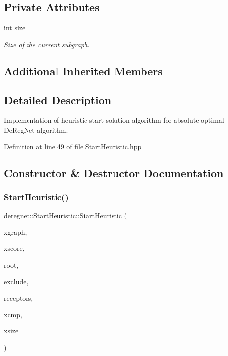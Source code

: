 \subsection*{Private Attributes}
\begin{DoxyCompactItemize}
\item 
int \hyperlink{classderegnet_1_1StartHeuristic_acd3b3c6a5103491c252b774545ad470b}{size}
\begin{DoxyCompactList}\small\item\em Size of the current subgraph. \end{DoxyCompactList}\end{DoxyCompactItemize}
\subsection*{Additional Inherited Members}


\subsection{Detailed Description}
Implementation of heuristic start solution algorithm for absolute optimal De\+Reg\+Net algorithm. 

Definition at line 49 of file Start\+Heuristic.\+hpp.



\subsection{Constructor \& Destructor Documentation}
\mbox{\label{classderegnet_1_1StartHeuristic_aff83b16a2ae0fd4041f19f787a0da23f}} 
\subsubsection{\texorpdfstring{Start\+Heuristic()}{StartHeuristic()}}
{\footnotesize\ttfamily deregnet\+::\+Start\+Heuristic\+::\+Start\+Heuristic (\begin{DoxyParamCaption}\item[{\hyperlink{namespacederegnet_a55b76c55bbabc682cbc61f8b9948799e}{Graph} $\ast$}]{xgraph,  }\item[{\hyperlink{namespacederegnet_ae102b707ae1d6f83c639ece5e0dd5658}{Node\+Map}$<$ double $>$ $\ast$}]{xscore,  }\item[{\hyperlink{namespacederegnet_a744bad34f2de9856d36715a445f027f3}{Node} $\ast$}]{root,  }\item[{std\+::set$<$ \hyperlink{namespacederegnet_a744bad34f2de9856d36715a445f027f3}{Node} $>$ $\ast$}]{exclude,  }\item[{std\+::set$<$ \hyperlink{namespacederegnet_a744bad34f2de9856d36715a445f027f3}{Node} $>$ $\ast$}]{receptors,  }\item[{std\+::function$<$ bool(double, double)$>$}]{xcmp,  }\item[{int}]{xsize }\end{DoxyParamCaption})}




